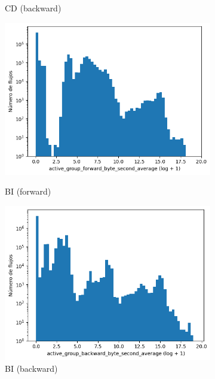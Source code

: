 \begin{figure}[H]
\begin{subfigure}[b]{0.26\textwidth}
        \caption{CD (backward)}
    \end{subfigure}
    \hfill
    \begin{subfigure}[b]{0.26\textwidth}
        \centering
        \includegraphics[width=\linewidth]{media/packet_pincer_botiot/active_group_forward_byte_second_average_log_x_log_y.png}
        \caption{BI (forward)}
        \includegraphics[width=\linewidth]{media/packet_pincer_botiot/active_group_backward_byte_second_average_log_x_log_y.png}
        \caption{BI (backward)}
    \end{subfigure}
    \hfill
    \begin{subfigure}[b]{0.26\textwidth}
        \centering

\end{subfigure}
\end{figure}
